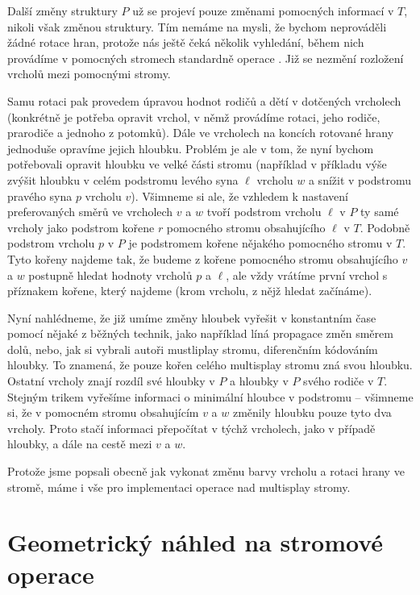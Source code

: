 Další změny struktury $P$ už se projeví pouze změnami pomocných informací v
$T$, nikoli však změnou struktury. Tím nemáme na mysli, že bychom neprováděli
žádné rotace hran, protože nás ještě čeká několik vyhledání, během nich
provádíme v pomocných stromech standardně operace . Již se nezmění
rozložení vrcholů mezi pomocnými stromy.

Samu rotaci pak provedem úpravou hodnot rodičů a dětí v dotčených vrcholech
(konkrétně je potřeba opravit vrchol, v němž provádíme rotaci, jeho rodiče,
prarodiče a jednoho z potomků). Dále ve vrcholech na koncích rotované hrany
jednoduše opravíme jejich hloubku. Problém je ale v tom, že nyní bychom
potřebovali opravit hloubku ve velké části stromu (například v příkladu výše
zvýšit hloubku v celém podstromu levého syna $\ell$ vrcholu $w$ a snížit v
podstromu pravého syna $p$ vrcholu $v$). Všimneme si ale, že vzhledem k
nastavení preferovaných směrů ve vrcholech $v$ a $w$ tvoří podstrom vrcholu
$\ell$ v $P$ ty samé vrcholy jako podstrom kořene $r$ pomocného stromu
obsahujícího $\ell$ v $T$. Podobně podstrom vrcholu $p$ v $P$ je podstromem
kořene nějakého pomocného stromu v $T$. Tyto kořeny najdeme tak, že budeme z
kořene pomocného stromu obsahujícího $v$ a $w$ postupně hledat hodnoty
vrcholů $p$ a $\ell$, ale vždy vrátíme první vrchol s příznakem kořene, který
najdeme (krom vrcholu, z nějž hledat začínáme).

Nyní nahlédneme, že již umíme změny hloubek vyřešit v konstantním čase pomocí nějaké
z běžných technik, jako například líná propagace změn směrem dolů, nebo, jak si
vybrali autoři mustliplay stromu, diferenčním kódováním hloubky. To znamená, že
pouze kořen celého multisplay stromu zná svou hloubku. Ostatní vrcholy znají
rozdíl své hloubky v $P$ a hloubky v $P$ svého rodiče v $T$. Stejným trikem
vyřešíme informaci o minimální hloubce v podstromu -- všimneme si, že v
pomocném stromu obsahujícím $v$ a $w$ změnily hloubku pouze tyto dva vrcholy.
Proto stačí informaci přepočítat v týchž vrcholech, jako v případě hloubky, a
dále na cestě mezi $v$ a $w$.

Protože jsme popsali obecně jak vykonat změnu barvy vrcholu a rotaci hrany ve stromě, máme i vše pro implementaci operace  nad multisplay stromy.

\section{Geometrický náhled na stromové operace}
